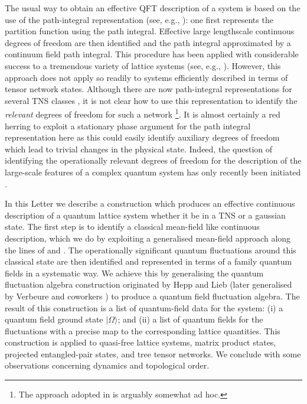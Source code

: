 \documentclass[prl,twocolumn,lengthcheck,superscriptaddress]{revtex4-1}
\theoremstyle{definition}
\theoremstyle{remark}
\begin{document}
The usual way to obtain an effective QFT description of a system is based on the use of the path-integral representation (see, e.g., \cite{wilson:1975a, auerbach:1994a}): one first represents the partition function using the path integral. Effective large lengthscale continuous degrees of freedom are then identified and the path integral approximated by a continuum field path integral. This procedure has been applied with considerable success to a tremendous variety of lattice systems (see, e.g., \cite{sachdev:2011a, fradkin:2013a}). However, this approach does not apply so readily to systems efficiently described in terms of tensor network states. Although there are now path-integral representations for several TNS classes \cite{brockt:2012a, jennings:2012a}, it is not clear how to use this representation to identify the \emph{relevant} degrees of freedom for such a network \footnote{The approach adopted in \cite{brockt:2012a, jennings:2012a} is arguably somewhat ad hoc.}. It is almost certainly a red herring to exploit a stationary phase argument for the path integral representation here as this could easily identify auxiliary degrees of freedom which lead to trivial changes in the physical state. Indeed, the question of identifying the operationally relevant degrees of freedom for the description of the large-scale features of a complex quantum system has only recently been initiated \cite{beny:2013a}.   

In this Letter we describe a construction which produces an effective continuous description of a quantum lattice system whether it be in a TNS or a gaussian state. The first step is to identify a classical mean-field like continuous description, which we do by exploiting a generalised mean-field approach along the lines of \cite{verbeure:2011a} and \cite{raggio:1989a,raggio:1991a}. The operationally significant quantum fluctuations around this classical state are then identified and represented in terms of a family quantum fields in a systematic way. We achieve this by generalising the quantum fluctuation algebra construction originated by Hepp and Lieb \cite{hepp:1973b} (later generalised by Verbeure and coworkers  \cite{goderis:1989d,goderis:1989c,goderis:1990b,goderis:1989b,goderis:1990a,goderis:1988a,goderis:1989a,michoel:1998a,requardt:2002a, verbeure:2011a}) to produce a quantum field fluctuation algebra. The result of this construction is a list of quantum-field data for the system: (i) a quantum field ground state $|\Omega\rangle$; and (ii) a list of quantum fields for the fluctuations with a precise map to the corresponding lattice quantities. This construction is applied to quasi-free lattice systems, matrix product states, projected entangled-pair states, and tree tensor networks. We conclude with some observations concerning dynamics and topological order.
\end{document}
